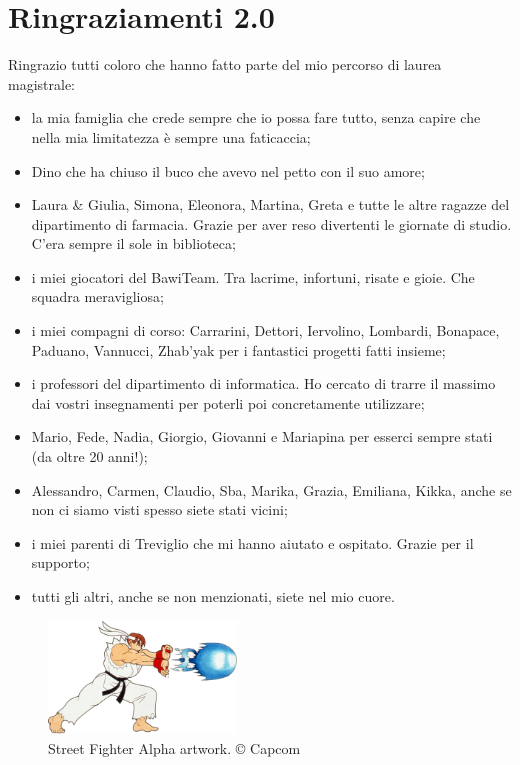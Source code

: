 %
%
\makeatletter\@openrightfalse\makeatother
\chapter*{Ringraziamenti 2.0}

Ringrazio tutti coloro che hanno fatto parte del mio percorso di laurea magistrale:
\begin{itemize}
	\item la mia famiglia che crede sempre che io possa fare tutto, senza capire che nella mia limitatezza è sempre una faticaccia;	
	\item Dino che ha chiuso il buco che avevo nel petto con il suo amore;
	\item Laura \& Giulia, Simona, Eleonora, Martina, Greta e tutte le altre ragazze del dipartimento di farmacia. Grazie per aver reso divertenti le giornate di studio. C'era sempre il sole in biblioteca;
	\item i miei giocatori del BawiTeam. Tra lacrime, infortuni, risate e gioie. Che squadra meravigliosa;
	\item i miei compagni di corso: Carrarini, Dettori, Iervolino, Lombardi, Bonapace, Paduano, Vannucci, Zhab'yak per i fantastici progetti fatti insieme;
	\item i professori del dipartimento di informatica. Ho cercato di trarre il massimo dai vostri insegnamenti per poterli poi concretamente utilizzare;
	\item Mario, Fede, Nadia, Giorgio, Giovanni e Mariapina per esserci sempre stati (da oltre 20 anni!);
	\item Alessandro, Carmen, Claudio, Sba, Marika, Grazia, Emiliana, Kikka, anche se non ci siamo visti spesso siete stati vicini;	
	\item i miei parenti di Treviglio che mi hanno aiutato e ospitato. Grazie per il supporto;
	\item tutti gli altri, anche se non menzionati, siete nel mio cuore.
\end{itemize}

\vspace*{\fill}

\begin{figure}[H]
	\centering
	\includegraphics[width=5cm]{immagini/hadoken}
	\caption{Street Fighter Alpha artwork. © Capcom}
	\label{fig:hadoken}
\end{figure}
